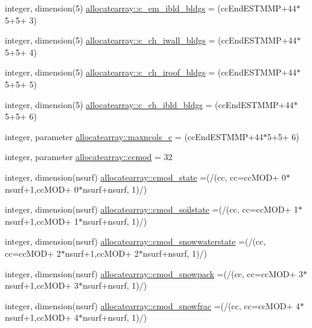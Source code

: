 \begin{DoxyCompactItemize}
\item 
integer, dimension(5) \hyperlink{namespaceallocatearray_ace6f070ae177c567fe76c17bb91034ef}{allocatearray\+::c\+\_\+em\+\_\+ibld\+\_\+bldgs} = (cc\+End\+E\+S\+T\+M\+MP+44$\ast$5+5+ 3)
\item 
integer, dimension(5) \hyperlink{namespaceallocatearray_a156720ee5527b3a9701d9ad18698e8b6}{allocatearray\+::c\+\_\+ch\+\_\+iwall\+\_\+bldgs} = (cc\+End\+E\+S\+T\+M\+MP+44$\ast$5+5+ 4)
\item 
integer, dimension(5) \hyperlink{namespaceallocatearray_a46eeb6c1e9d75b2402799845e833d5e7}{allocatearray\+::c\+\_\+ch\+\_\+iroof\+\_\+bldgs} = (cc\+End\+E\+S\+T\+M\+MP+44$\ast$5+5+ 5)
\item 
integer, dimension(5) \hyperlink{namespaceallocatearray_a35459b33135ea1d0051778a726c8e1e9}{allocatearray\+::c\+\_\+ch\+\_\+ibld\+\_\+bldgs} = (cc\+End\+E\+S\+T\+M\+MP+44$\ast$5+5+ 6)
\item 
integer, parameter \hyperlink{namespaceallocatearray_a733b5ec7d7c0cf4c5407515ed555251f}{allocatearray\+::maxncols\+\_\+c} = (cc\+End\+E\+S\+T\+M\+MP+44$\ast$5+5+ 6)
\item 
integer, parameter \hyperlink{namespaceallocatearray_a93cbccce6abf3ac7e437099b001937d2}{allocatearray\+::ccmod} = 32
\item 
integer, dimension(nsurf) \hyperlink{namespaceallocatearray_ada5fca539fc9eb27ca314e4c9994c4dd}{allocatearray\+::cmod\+\_\+state} =(/(cc, cc=cc\+M\+OD+ 0$\ast$nsurf+1,cc\+M\+OD+ 0$\ast$nsurf+nsurf, 1)/)
\item 
integer, dimension(nsurf) \hyperlink{namespaceallocatearray_abc11b77f7e2b79059d31a63ef02209f7}{allocatearray\+::cmod\+\_\+soilstate} =(/(cc, cc=cc\+M\+OD+ 1$\ast$nsurf+1,cc\+M\+OD+ 1$\ast$nsurf+nsurf, 1)/)
\item 
integer, dimension(nsurf) \hyperlink{namespaceallocatearray_a7444244e175c845f71646708c7fc0f00}{allocatearray\+::cmod\+\_\+snowwaterstate} =(/(cc, cc=cc\+M\+OD+ 2$\ast$nsurf+1,cc\+M\+OD+ 2$\ast$nsurf+nsurf, 1)/)
\item 
integer, dimension(nsurf) \hyperlink{namespaceallocatearray_aa3c37a930996b3a000e908072c505001}{allocatearray\+::cmod\+\_\+snowpack} =(/(cc, cc=cc\+M\+OD+ 3$\ast$nsurf+1,cc\+M\+OD+ 3$\ast$nsurf+nsurf, 1)/)
\item 
integer, dimension(nsurf) \hyperlink{namespaceallocatearray_a6e9e5b824a22feef38fdf8f241394d5e}{allocatearray\+::cmod\+\_\+snowfrac} =(/(cc, cc=cc\+M\+OD+ 4$\ast$nsurf+1,cc\+M\+OD+ 4$\ast$nsurf+nsurf, 1)/)
\item 

\end{DoxyCompactItemize}
